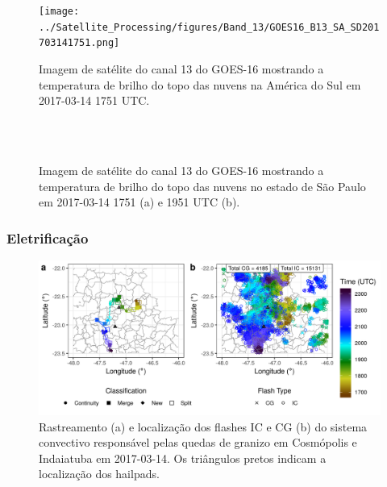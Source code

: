 \begin{figure}[htb]
	\begin{center}
		\caption{Imagem de satélite do canal 13 do GOES-16 mostrando a temperatura de brilho do topo das nuvens na América do Sul em 2017-03-14 1751 UTC.} 
		\label{goes16_sa_20170314}
		\texttt{[image: ../Satellite\_Processing/figures/Band\_13/GOES16\_B13\_SA\_SD201703141751.png]}
	\end{center}
\end{figure}


\begin{figure}[htb]
	\begin{center}
		\caption{Imagem de satélite do canal 13 do GOES-16 mostrando a temperatura de brilho do topo das nuvens no estado de São Paulo em 2017-03-14 1751 (a) e 1951 UTC (b).} 
		\label{goes16_sp_20170314}
		 \\
		 \\
	\end{center}
\end{figure}

\subsubsection{Eletrificação}\label{elec_201703014}

\begin{figure}[htb]
	\begin{center}
		\caption{Rastreamento (a) e localização dos flashes IC e CG (b) do sistema convectivo responsável pelas quedas de granizo em Cosmópolis e Indaiatuba em 2017-03-14. Os triângulos pretos indicam a localização dos hailpads.} 
		\label{track_flashes_20170314}
		\includegraphics[width=\columnwidth]{../General_Processing/figures/track_flashes_20170314.png}
	\end{center}
\end{figure}

